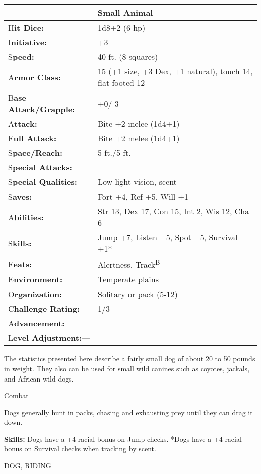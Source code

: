 \documentclass{article}
\begin{document}
\begin{tabular}{|>{\raggedright}p{91pt}|>{\raggedright}p{226pt}|}
\hline
  & Small Animal\tabularnewline
\hline
H\textbf{it Dice:} & 1d8+2 (6 hp)\tabularnewline
\hline
I\textbf{nitiative:} & +3\tabularnewline
\hline
S\textbf{peed:} & 40 ft. (8 squares)\tabularnewline
\hline
A\textbf{rmor Class:} & 15 (+1 size, +3 Dex, +1 natural), touch 14, flat-footed 
12\tabularnewline
\hline
B\textbf{ase Attack/Grapple:} & +0/-3\tabularnewline
\hline
A\textbf{ttack:} & Bite +2 melee (1d4+1)\tabularnewline
\hline
F\textbf{ull Attack:} & Bite +2 melee (1d4+1)\tabularnewline
\hline
S\textbf{pace/Reach:} & 5 ft./5 ft.\tabularnewline
\hline
S\textbf{pecial Attacks:}--- & \tabularnewline
\hline
S\textbf{pecial Qualities:} & Low-light vision, scent\tabularnewline
\hline
S\textbf{aves:} & Fort +4, Ref +5, Will +1\tabularnewline
\hline
A\textbf{bilities:} & Str 13, Dex 17, Con 15, Int 2, Wis 12, Cha 6\tabularnewline
\hline
S\textbf{kills:} & Jump +7, Listen +5, Spot +5, Survival +1*\tabularnewline
\hline
F\textbf{eats:} & Alertness, Track\textsuperscript{B}\tabularnewline
\hline
E\textbf{nvironment:} & Temperate plains\tabularnewline
\hline
O\textbf{rganization:} & Solitary or pack (5-12)\tabularnewline
\hline
C\textbf{hallenge Rating:} & 1/3\tabularnewline
\hline
A\textbf{dvancement:}--- & \tabularnewline
\hline
L\textbf{evel Adjustment:}--- & \tabularnewline
\hline
\end{tabular}

The statistics presented here describe a fairly small dog of about 20 to 50 pounds 
in weight. They also can be used for small wild canines such as coyotes, jackals, 
and African wild dogs.

Combat

Dogs generally hunt in packs, chasing and exhausting prey until they can drag it 
down.

\textbf{Skills: }Dogs have a +4 racial bonus on Jump checks. *Dogs have a +4 racial 
bonus on Survival checks when tracking by scent.

\vspace{12pt}
DOG, RIDING
\end{document}
